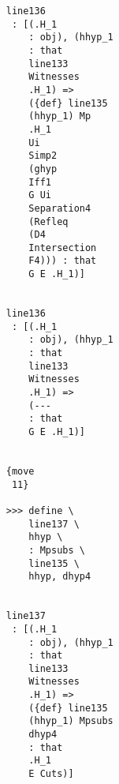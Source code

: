 \documentclass[12pt]{article}
\begin{document}
\begin{verbatim}
                                    line136 
                                     : [(.H_1 
                                        : obj), (hhyp_1 
                                        : that 
                                        line133 
                                        Witnesses 
                                        .H_1) => 
                                        ({def} line135 
                                        (hhyp_1) Mp 
                                        .H_1 
                                        Ui 
                                        Simp2 
                                        (ghyp 
                                        Iff1 
                                        G Ui 
                                        Separation4 
                                        (Refleq 
                                        (D4 
                                        Intersection 
                                        F4))) : that 
                                        G E .H_1)]


                                    line136 
                                     : [(.H_1 
                                        : obj), (hhyp_1 
                                        : that 
                                        line133 
                                        Witnesses 
                                        .H_1) => 
                                        (--- 
                                        : that 
                                        G E .H_1)]


                                    {move 
                                     11}

                                    >>> define \
                                        line137 \
                                        hhyp \
                                        : Mpsubs \
                                        line135 \
                                        hhyp, dhyp4


                                    line137 
                                     : [(.H_1 
                                        : obj), (hhyp_1 
                                        : that 
                                        line133 
                                        Witnesses 
                                        .H_1) => 
                                        ({def} line135 
                                        (hhyp_1) Mpsubs 
                                        dhyp4 
                                        : that 
                                        .H_1 
                                        E Cuts)]



\end{verbatim}
\end{document}

